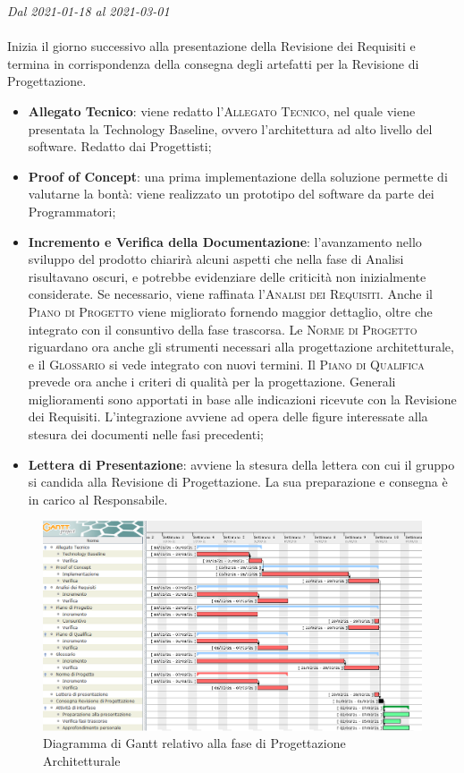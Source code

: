 \textit{Dal 2021-01-18 al 2021-03-01}
\\\\
Inizia il giorno successivo alla presentazione della Revisione dei Requisiti e termina in corrispondenza della consegna degli artefatti per la Revisione di Progettazione.
\begin{itemize}
	\item \textbf{Allegato Tecnico}: viene redatto l'\textsc{Allegato Tecnico}, nel quale viene presentata la Technology Baseline, ovvero l'architettura ad alto livello del software. Redatto dai Progettisti;
	\item \textbf{Proof of Concept}: una prima implementazione della soluzione permette di valutarne la bontà: viene realizzato un prototipo del software da parte dei Programmatori;
	\item \textbf{Incremento e Verifica della Documentazione}: l'avanzamento nello sviluppo del prodotto chiarirà alcuni aspetti che nella fase di Analisi risultavano oscuri, e potrebbe evidenziare delle criticità non inizialmente considerate. Se necessario, viene raffinata l'\textsc{Analisi dei Requisiti}. Anche il \textsc{Piano di Progetto} viene migliorato fornendo maggior dettaglio, oltre che integrato con il consuntivo della fase trascorsa. Le \textsc{Norme di Progetto} riguardano ora anche gli strumenti necessari alla progettazione architetturale, e il \textsc{Glossario} si vede integrato con nuovi termini. Il \textsc{Piano di Qualifica} prevede ora anche i criteri di qualità per la progettazione. Generali miglioramenti sono apportati in base alle indicazioni ricevute con la Revisione dei Requisiti. L'integrazione avviene ad opera delle figure interessate alla stesura dei documenti nelle fasi precedenti;
	\item \textbf{Lettera di Presentazione}: avviene la stesura della lettera con cui il gruppo si candida alla Revisione di Progettazione. La sua preparazione e consegna è in carico al Responsabile.
\end{itemize}

\begin{figure}[H]
	\centering
	\includegraphics[scale=0.50]{res/images/03_gantt_progettazione.png}
	\caption{Diagramma di Gantt relativo alla fase di Progettazione Architetturale}
\end{figure}

